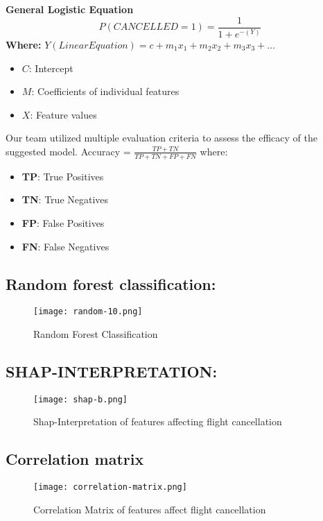 \documentclass[conference]{IEEEtran}
\begin{document}
\noindent \textbf{General Logistic Equation}
\[
P(CANCELLED=1) = \frac{1}{1 + e^{-(Y)}}
\]
\noindent \textbf{Where:}
\noindent $Y(Linear Equation) = c + m_1x_1 + m_2x_2 + m_3x_3 + \dots$



\begin{itemize}
    \item $C$: Intercept
    \item $M$: Coefficients of individual features
    \item $X$: Feature values
\end{itemize}

\noindent Our team utilized multiple evaluation criteria to assess the efficacy of the suggested model.
\noindent Accuracy = \(\frac{TP + TN}{TP + TN + FP + FN}\)
\noindent where:
\begin{itemize}
    \item \textbf{TP}: True Positives
    \item \textbf{TN}: True Negatives
    \item \textbf{FP}: False Positives
    \item \textbf{FN}: False Negatives
\end{itemize}
\subsection{Random forest  classification:}\label{subsec3}
\begin{figure}[htbp]
    \centering
    \texttt{[image: random-10.png]} %
    \caption{Random Forest Classification}
    \label{fig:2}
\end{figure}
\subsection{SHAP-INTERPRETATION:}\label{subsec3}

\begin{figure} [htbp]
    \centering
    \texttt{[image: shap-b.png]} %
    \caption{Shap-Interpretation of features affecting flight cancellation }
    \label{fig:3}
\end{figure}

\subsection{Correlation matrix}\label{subsec4}

\begin{figure} [htbp]
    \centering
    \texttt{[image: correlation-matrix.png]} %
    \caption{Correlation Matrix of features affect flight cancellation}
    \label{fig:3}

\end{figure}
\end{document}

